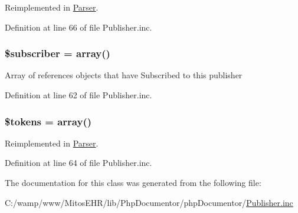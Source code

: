 \-Reimplemented in \hyperlink{class_parser_afa3ebd7022a716d664b6e3bae77e0e4c}{\-Parser}.



\-Definition at line 66 of file \-Publisher.\-inc.

\hypertarget{class_publisher_aa529fc6e5ab7f12c92aa75cd866fdd81}{
\subsubsection[{\$subscriber}]{\setlength{\rightskip}{0pt plus 5cm}\$subscriber = array()}}\label{class_publisher_aa529fc6e5ab7f12c92aa75cd866fdd81}
\-Array of references objects that have \-Subscribed to this publisher 

\-Definition at line 62 of file \-Publisher.\-inc.

\hypertarget{class_publisher_a72ead29e4317fbc4335fd3ba764e8b59}{
\subsubsection[{\$tokens}]{\setlength{\rightskip}{0pt plus 5cm}\$tokens = array()}}\label{class_publisher_a72ead29e4317fbc4335fd3ba764e8b59}


\-Reimplemented in \hyperlink{class_parser_a72ead29e4317fbc4335fd3ba764e8b59}{\-Parser}.



\-Definition at line 64 of file \-Publisher.\-inc.



\-The documentation for this class was generated from the following file\-:\begin{DoxyCompactItemize}
\item 
\-C\-:/wamp/www/\-Mitos\-E\-H\-R/lib/\-Php\-Documentor/php\-Documentor/\hyperlink{_publisher_8inc}{\-Publisher.\-inc}\end{DoxyCompactItemize}
